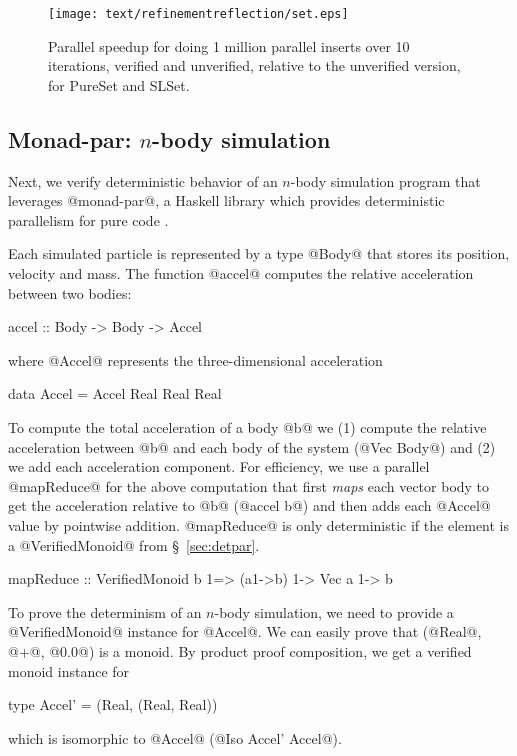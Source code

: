 \begin{figure}
\captionsetup{justification=centering}
  \begin{center}
    \texttt{[image: text/refinementreflection/set.eps]}
  \end{center}
  \caption[Parallel speedup for PureSet and SLSet.]
    {Parallel speedup for doing 1 million parallel inserts over 10
    iterations, verified and unverified, relative to the unverified version,
    for PureSet and SLSet.}
  \label{fig:set}
\end{figure}

\subsection{Monad-par: $n$-body simulation}
\label{sec:nbody}
Next, we verify deterministic behavior of an
$n$-body simulation program that leverages @monad-par@, a Haskell library which
provides deterministic parallelism for pure code \cite{monad-par}.

Each simulated particle is represented by a
type @Body@ that stores its position, velocity and mass.
%
The function @accel@ computes the relative acceleration
between two bodies:
\begin{mcode}
  accel :: Body -> Body -> Accel
\end{mcode}
where @Accel@ represents the three-dimensional acceleration
\begin{mcode}
  data Accel = Accel Real Real Real
\end{mcode}
%
To compute the total acceleration
of a body @b@ we
(1) compute the relative acceleration between @b@
and each body of the system (@Vec Body@) and
(2) we add each acceleration component.
%
For efficiency, we use a parallel @mapReduce@ for the above
computation that
first \textit{maps} each vector body to get the acceleration relative to @b@
(@accel b@) and then adds each @Accel@ value by pointwise addition.
%
@mapReduce@ is only deterministic if the element is a @VerifiedMonoid@
from \S~\ref{sec:detpar}.
\begin{mcode}
mapReduce :: VerifiedMonoid b 1=> (a1->b) 1-> Vec a 1-> b
\end{mcode}
%
To prove the determinism of an $n$-body simulation, we need to provide a
@VerifiedMonoid@ instance for @Accel@.
%
We can easily prove that (@Real@, @+@, @0.0@)
is a monoid.
%
By product proof composition, we get a verified monoid instance for
\begin{mcode}
  type Accel' = (Real, (Real, Real))
\end{mcode}
which is isomorphic to @Accel@ (\ie @Iso Accel' Accel@).

